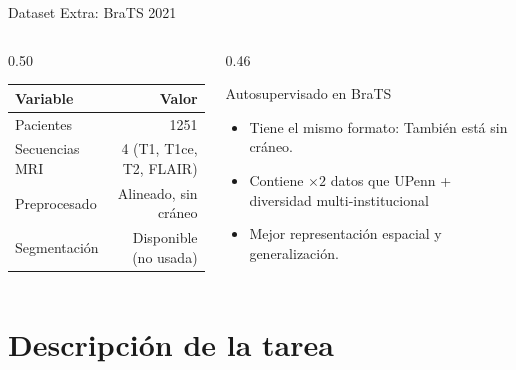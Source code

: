 \documentclass[aspectratio=169]{beamer}
\begin{document}
\begin{frame}{Dataset Extra: BraTS 2021}
  \begin{columns}[T]
    \begin{column}{0.50\textwidth}
      \centering\footnotesize
      \begin{tabular}{lr}
        \toprule
        \textbf{Variable} & \textbf{Valor} \\
        \midrule
        Pacientes              & 1251 \\
        Secuencias MRI         & 4 (T1, T1ce, T2, FLAIR) \\
        Preprocesado           & Alineado, sin cráneo \\
        Segmentación           & Disponible (no usada) \\
        \bottomrule
      \end{tabular}

  \end{column}
  \begin{column}{0.46\textwidth}
    \begin{block}{Autosupervisado en BraTS}
      \small
      
      \begin{itemize}
        \item Tiene el mismo formato: También está sin cráneo.
        \item Contiene $\times2$ datos que UPenn + diversidad multi-institucional\\
        \item Mejor representación espacial y generalización.
      \end{itemize}
      \end{block}

    \end{column}
  \end{columns}
\end{frame}


\section{Descripción de la tarea}
\end{document}
